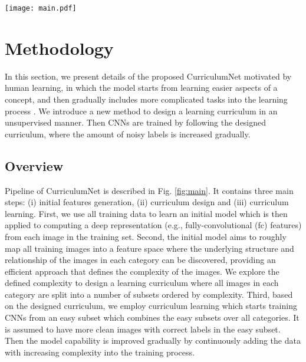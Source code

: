 \documentclass[runningheads]{llncs}
\begin{document}
\begin{figure*}[tb]
	\begin{center}
		\texttt{[image: main.pdf]}
	\end{center}
\vspace{-5mm}
	\caption{Pipeline of the proposed CurriculumNet. The training process includes three main steps： initial features generation, curriculum design and curriculum learning.}
	\label{fig:main}
\end{figure*}

\section{Methodology}

In this section, we present details of the proposed CurriculumNet motivated by human learning, in which the model starts from learning easier aspects of a concept, and then gradually includes more complicated tasks into the  learning process \cite{bengio2009curriculum}. We introduce a new method to design a learning curriculum in an unsupervised manner. Then CNNs are trained by following the designed curriculum, where the amount of noisy labels is increased gradually.










\subsection{Overview}

 Pipeline of CurriculumNet is described in Fig. \ref{fig:main}. It contains three main steps: (i) initial features generation, (ii) curriculum design and (iii) curriculum learning. First, we use all training data to learn an initial model which is then applied to computing a deep representation (e.g., fully-convolutional (fc) features) from each image in the training set. Second, the initial model aims to roughly map all training images into a feature space where the underlying structure and relationship of the images in each category can be discovered, providing an efficient approach that defines the complexity of the images. We explore the defined complexity to design a learning curriculum where all images in each category are split into a number of subsets ordered by complexity.
 Third, based on the designed curriculum, we employ curriculum learning which starts training CNNs from an easy subset which combines the easy subsets over all categories. It is assumed to have more clean images with correct labels in the easy subset. Then the model capability is improved gradually by continuously adding the data with increasing complexity into the training process.
\end{document}
